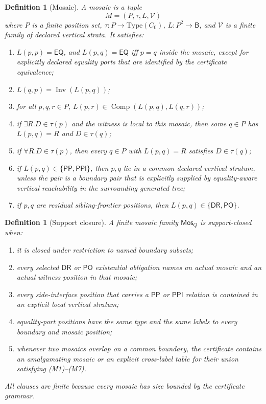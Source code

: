 \documentclass[11pt]{article}
\newtheorem{definition}[theorem]{Definition}
\newcommand{\Base}{\mathsf B}
\newcommand{\EQ}{\mathsf{EQ}}
\newcommand{\PP}{\mathsf{PP}}
\newcommand{\PPI}{\mathsf{PPI}}
\newcommand{\PO}{\mathsf{PO}}
\newcommand{\DR}{\mathsf{DR}}
\newcommand{\Inv}{\operatorname{Inv}}
\newcommand{\comp}{\operatorname{Comp}}
\newcommand{\Mos}{\mathsf{Mos}}
\begin{document}
\begin{definition}[Mosaic]
A mosaic is a tuple
\[
  M=(P,\tau,L,\mathcal V)
\]
where \(P\) is a finite position set, \(\tau:P\to\mathrm{Type}(C_0)\), \(L:P^2\to\Base\), and \(\mathcal V\) is a finite family of declared vertical strata.  It satisfies:
\begin{enumerate}[label=(M\arabic*)]
\item \(L(p,p)=\EQ\), and \(L(p,q)=\EQ\) iff \(p=q\) inside the mosaic, except for explicitly declared equality ports that are identified by the certificate equivalence;
\item \(L(q,p)=\Inv(L(p,q))\);
\item for all \(p,q,r\in P\), \(L(p,r)\in\comp(L(p,q),L(q,r))\);
\item if \(\exists R.D\in\tau(p)\) and the witness is local to this mosaic, then some \(q\in P\) has \(L(p,q)=R\) and \(D\in\tau(q)\);
\item if \(\forall R.D\in\tau(p)\), then every \(q\in P\) with \(L(p,q)=R\) satisfies \(D\in\tau(q)\);
\item if \(L(p,q)\in\{\PP,\PPI\}\), then \(p,q\) lie in a common declared vertical stratum, unless the pair is a boundary pair that is explicitly supplied by equality-aware vertical reachability in the surrounding generated tree;
\item if \(p,q\) are residual sibling-frontier positions, then \(L(p,q)\in\{\DR,\PO\}\).
\end{enumerate}
\end{definition}

\begin{definition}[Support closure]
A finite mosaic family \(\Mos_Q\) is support-closed when:
\begin{enumerate}[label=(SC\arabic*)]
\item it is closed under restriction to named boundary subsets;
\item every selected \(\DR\) or \(\PO\) existential obligation names an actual mosaic and an actual witness position in that mosaic;
\item every side-interface position that carries a \(\PP\) or \(\PPI\) relation is contained in an explicit local vertical stratum;
\item equality-port positions have the same type and the same labels to every boundary and mosaic position;
\item whenever two mosaics overlap on a common boundary, the certificate contains an amalgamating mosaic or an explicit cross-label table for their union satisfying (M1)--(M7).
\end{enumerate}
All clauses are finite because every mosaic has size bounded by the certificate grammar.
\end{definition}
\end{document}
